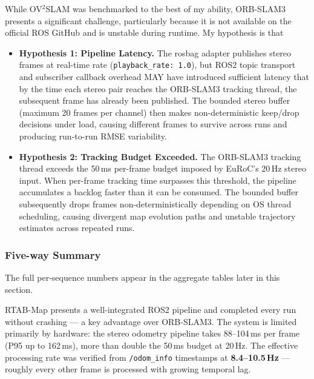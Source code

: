 \documentclass[11pt]{article}
\begin{document}
While OV$^{2}$SLAM was benchmarked to the best of my ability, ORB-SLAM3 presents a significant challenge, particularly because it is not available on the official ROS GitHub and is unstable during runtime. My hypothesis is that
\begin{itemize}
    \item \textbf{Hypothesis 1: Pipeline Latency.} The rosbag adapter publishes stereo frames at real-time rate (\texttt{playback\_rate: 1.0}), but ROS2 topic transport and subscriber callback overhead MAY have introduced sufficient latency that by the time each stereo pair reaches the ORB-SLAM3 tracking thread, the subsequent frame has already been published. The bounded stereo buffer (maximum 20 frames per channel) then makes non-deterministic keep/drop decisions under load, causing different frames to survive across runs and producing run-to-run RMSE variability.

    \item \textbf{Hypothesis 2: Tracking Budget Exceeded.} The ORB-SLAM3 tracking thread exceeds the 50\,ms per-frame budget imposed by EuRoC's 20\,Hz stereo input. When per-frame tracking time surpasses this threshold, the pipeline accumulates a backlog faster than it can be consumed. The bounded buffer subsequently drops frames non-deterministically depending on OS thread scheduling, causing divergent map evolution paths and unstable trajectory estimates across repeated runs.
\end{itemize}

\subsubsection{Five-way Summary}

The full per-sequence numbers appear in the aggregate tables later in this section.

RTAB-Map presents a well-integrated ROS2 pipeline and completed every run without crashing — a key advantage over ORB-SLAM3. The system is limited primarily by hardware: the stereo odometry pipeline takes 88--104\,ms per frame (P95 up to 162\,ms), more than double the 50\,ms budget at 20\,Hz. The effective processing rate was verified from \texttt{/odom\_info} timestamps at \textbf{8.4--10.5\,Hz} — roughly every other frame is processed with growing temporal lag.
\end{document}
